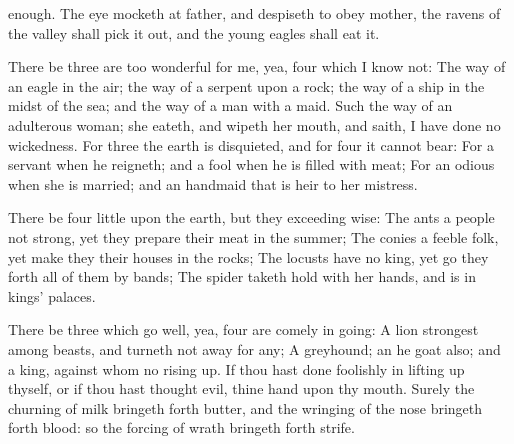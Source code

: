 {enough.
The
eye
{}
mocketh at
{}
father, and
despiseth to
obey
{}
mother, the
ravens of the
valley shall pick it
out, and the
young
eagles shall
eat it.
\par }{\PP {}There be
three
{} are too
wonderful for me, yea,
four which I
know not:
The
way of an
eagle in the
air; the
way of a
serpent upon a
rock; the
way of a
ship in the
midst of the
sea; and the
way of a
man with a
maid.
Such
{} the
way of an
adulterous
woman; she
eateth, and
wipeth her
mouth, and
saith, I have
done no
wickedness.
For
three
{} the
earth is
disquieted, and for
four
{} it
cannot
bear:
For a
servant when he
reigneth; and a
fool when he is
filled with
meat;
For an
odious
{} when she is
married; and an
handmaid that is
heir to her
mistress.
\par }{\PP {}There be
four
{}
little upon the
earth, but they
{}
exceeding
wise:
The
ants
{} a
people not
strong, yet they
prepare their
meat in the
summer;
The
conies
{} a
feeble
folk, yet
make they their
houses in the
rocks;
The
locusts have no
king, yet go they
forth all of them by
bands;
The
spider taketh
hold with her
hands, and is in
kings’
palaces.
\par }{\PP {}There be
three
{} which
go
well, yea,
four are
comely in
going:
A
lion
{}
strongest among
beasts, and turneth not
away
for any;
A
greyhound; an he
goat
also; and a
king, against whom
{} no rising
up.
If thou hast done
foolishly in lifting
up thyself, or if thou hast thought
evil,
{} thine
hand upon thy
mouth.
Surely the
churning of
milk bringeth
forth
butter, and the
wringing of the
nose bringeth
forth
blood: so the
forcing of
wrath bringeth
forth
strife.

}
